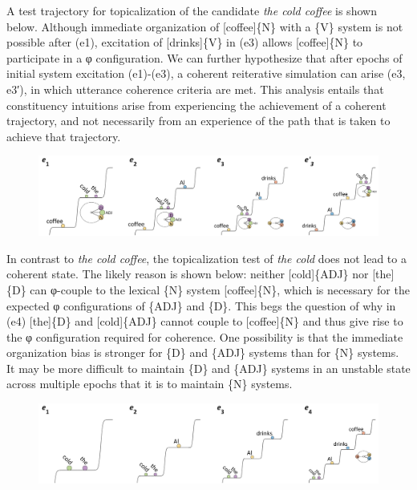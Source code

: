   A test trajectory for topicalization of the candidate \textit{the cold coffee} is shown below. Although immediate organization of [coffee]\{N\} with a \{V\} system is not possible after (e1), excitation of [drinks]\{V\} in (e3) allows [coffee]\{N\} to participate in a φ configuration. We can further hypothesize that after epochs of initial system excitation (e1)-(e3), a coherent reiterative simulation can arise (e3, e3′), in which utterance coherence criteria are met. This analysis entails that constituency intuitions arise from experiencing the achievement of a coherent trajectory, and not necessarily from an experience of the path that is taken to achieve that trajectory.

  
\begin{figure}
\includegraphics[width=\textwidth]{figures/Tilsen-img138.png}
\caption{\missingcaption}
\label{fig:6:19}
\end{figure}
 

  In contrast to \textit{the cold coffee}, the topicalization test of \textit{the cold} does not lead to a coherent state. The likely reason is shown below: neither [cold]\{ADJ\} nor [the]\{D\} can φ-couple to the lexical \{N\} system [coffee]\{N\}, which is necessary for the expected φ configurations of \{ADJ\} and \{D\}. This begs the question of why in (e4) [the]\{D\} and [cold]\{ADJ\} cannot couple to [coffee]\{N\} and thus give rise to the φ configuration required for coherence. One possibility is that the immediate organization bias is stronger for \{D\} and \{ADJ\} systems than for \{N\} systems. It may be more difficult to maintain \{D\} and \{ADJ\} systems in an unstable state across multiple epochs that it is to maintain \{N\} systems.

  
\begin{figure}
\includegraphics[width=\textwidth]{figures/Tilsen-img139.png}
\caption{\missingcaption}
\label{fig:6:20}
\end{figure}
 

